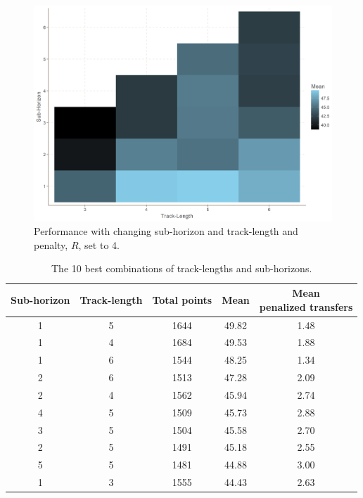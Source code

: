 \begin{figure}[htb]
    \centering
    \includegraphics[scale=0.35]{fig/chapter_6/pen_4.png}
    \caption{Performance with changing sub-horizon and track-length and penalty, $R$, set to 4.}
\label{fig:pen_4}    
\end{figure}


\begin{table}[htb]
\centering
\begin{tabular}{|c|c|c|c|c|}
\hline
Sub-horizon & Track-length & Total points & Mean &  \makecell{Mean \\ penalized transfers} \\
\hline
1 \Tstrut       & 5          & 1644             & 49.82 & 1.48       \\
1       & 4          & 1684             & 49.53 & 1.88       \\
1       & 6          & 1544             & 48.25 & 1.34       \\
2       & 6          & 1513             & 47.28 & 2.09       \\
2       & 4          & 1562             & 45.94 & 2.74       \\
4       & 5          & 1509             & 45.73 & 2.88       \\
3       & 5          & 1504             & 45.58 & 2.70       \\
2       & 5          & 1491             & 45.18 & 2.55       \\
5       & 5          & 1481             & 44.88 & 3.00       \\
1   \Bstrut     & 3          & 1555             & 44.43 & 2.63       \\
\hline
\end{tabular}
\caption{The 10 best combinations of track-lengths and sub-horizons.}
\label{tab:pen_4_ill_trans}
\end{table}

